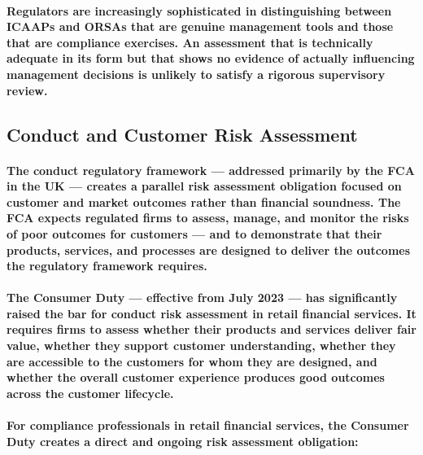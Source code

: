 \paragraph{Regulators are increasingly sophisticated in distinguishing between ICAAPs and ORSAs that are genuine management tools and those that are compliance exercises. An assessment that is technically adequate in its form but that shows no evidence of actually influencing management decisions is unlikely to satisfy a rigorous supervisory review.}

\subsection{Conduct and Customer Risk Assessment}
\paragraph{The \textbf{conduct regulatory framework} — addressed primarily by the FCA in the UK — creates a parallel risk assessment obligation focused on customer and market outcomes rather than financial soundness. The FCA expects regulated firms to assess, manage, and monitor the risks of poor outcomes for customers — and to demonstrate that their products, services, and processes are designed to deliver the outcomes the regulatory framework requires.}
\paragraph{The \textbf{Consumer Duty} — effective from July 2023 — has significantly raised the bar for conduct risk assessment in retail financial services. It requires firms to assess whether their products and services deliver fair value, whether they support customer understanding, whether they are accessible to the customers for whom they are designed, and whether the overall customer experience produces good outcomes across the customer lifecycle.}
\paragraph{For compliance professionals in retail financial services, the Consumer Duty creates a direct and ongoing risk assessment obligation:}
\begin{itemize}
\end{itemize}

